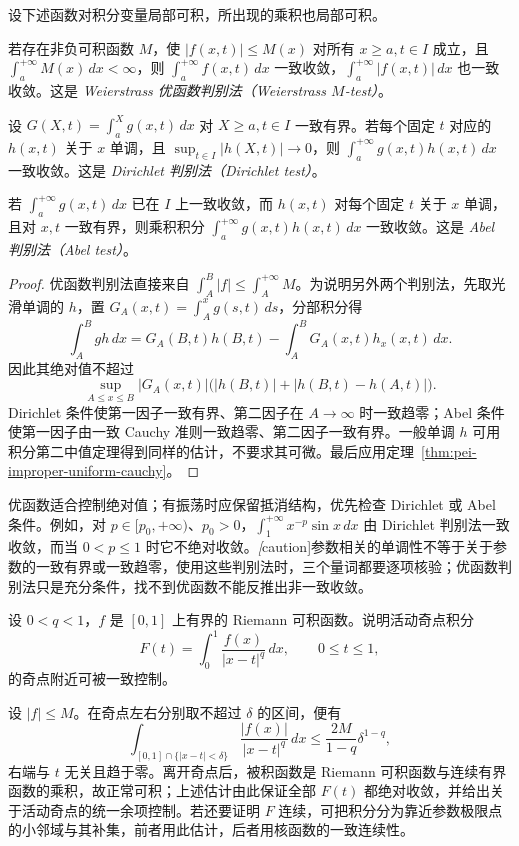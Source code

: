 \begin{theorem}
\label{thm:pei-improper-tests}
设下述函数对积分变量局部可积，所出现的乘积也局部可积。

若存在非负可积函数 $M$，使 $|f(x,t)|\le M(x)$ 对所有 $x\ge a,t\in I$ 成立，且 $\int_a^{+\infty}M(x)\,dx<\infty$，则 $\int_a^{+\infty}f(x,t)\,dx$ 一致收敛，$\int_a^{+\infty}|f(x,t)|\,dx$ 也一致收敛。这是 \emph{Weierstrass 优函数判别法（Weierstrass $M$-test）}。

设 $G(X,t)=\int_a^X g(x,t)\,dx$ 对 $X\ge a,t\in I$ 一致有界。若每个固定 $t$ 对应的 $h(x,t)$ 关于 $x$ 单调，且 $\sup_{t\in I}|h(X,t)|\to0$，则 $\int_a^{+\infty}g(x,t)h(x,t)\,dx$ 一致收敛。这是 \emph{Dirichlet 判别法（Dirichlet test）}。

若 $\int_a^{+\infty}g(x,t)\,dx$ 已在 $I$ 上一致收敛，而 $h(x,t)$ 对每个固定 $t$ 关于 $x$ 单调，且对 $x,t$ 一致有界，则乘积积分 $\int_a^{+\infty}g(x,t)h(x,t)\,dx$ 一致收敛。这是 \emph{Abel 判别法（Abel test）}。
\end{theorem}
\begin{proof}
优函数判别法直接来自 $\int_A^B|f|\le\int_A^{+\infty}M$。为说明另外两个判别法，先取光滑单调的 $h$，置 $G_A(x,t)=\int_A^xg(s,t)\,ds$，分部积分得
\[
\int_A^B gh\,dx=G_A(B,t)h(B,t)-\int_A^B G_A(x,t)h_x(x,t)\,dx.
\]
因此其绝对值不超过
\[
\sup_{A\le x\le B}|G_A(x,t)|
\bigl(|h(B,t)|+|h(B,t)-h(A,t)|\bigr).
\]
Dirichlet 条件使第一因子一致有界、第二因子在 $A\to\infty$ 时一致趋零；Abel 条件使第一因子由一致 Cauchy 准则一致趋零、第二因子一致有界。一般单调 $h$ 可用积分第二中值定理得到同样的估计，不要求其可微。最后应用定理~\ref{thm:pei-improper-uniform-cauchy}。
\end{proof}

优函数适合控制绝对值；有振荡时应保留抵消结构，优先检查 Dirichlet 或 Abel 条件。例如，对 $p\in[p_0,+\infty)$、$p_0>0$，$\int_1^{+\infty}x^{-p}\sin x\,dx$ 由 Dirichlet 判别法一致收敛，而当 $0<p\le1$ 时它不绝对收敛。\emph[caution]{参数相关的单调性不等于关于参数的一致有界或一致趋零}，使用这些判别法时，三个量词都要逐项核验；优函数判别法只是充分条件，找不到优函数不能反推出非一致收敛。

\begin{example}
\label{ex:pei-moving-singularity}
设 $0<q<1$，$f$ 是 $[0,1]$ 上有界的 Riemann 可积函数。说明活动奇点积分
\[
F(t)=\int_0^1\frac{f(x)}{|x-t|^q}\,dx,\qquad 0\le t\le1,
\]
的奇点附近可被一致控制。
\end{example}
\begin{solve}
设 $|f|\le M$。在奇点左右分别取不超过 $\delta$ 的区间，便有
\[
\int_{[0,1]\cap\{|x-t|<\delta\}}
\frac{|f(x)|}{|x-t|^q}\,dx
\le\frac{2M}{1-q}\delta^{1-q},
\]
右端与 $t$ 无关且趋于零。离开奇点后，被积函数是 Riemann 可积函数与连续有界函数的乘积，故正常可积；上述估计由此保证全部 $F(t)$ 都绝对收敛，并给出关于活动奇点的统一余项控制。若还要证明 $F$ 连续，可把积分分为靠近参数极限点的小邻域与其补集，前者用此估计，后者用核函数的一致连续性。
\end{solve}

